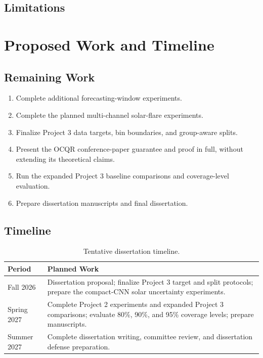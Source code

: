 \documentclass[12pt]{report}
\begin{document}
\section{Limitations}

\chapter{Proposed Work and Timeline}
\label{chap:timeline}

\section{Remaining Work}

\begin{enumerate}
    \item Complete additional forecasting-window experiments.
    \item Complete the planned multi-channel solar-flare experiments.
    \item Finalize Project 3 data targets, bin boundaries, and group-aware splits.
    \item Present the OCQR conference-paper guarantee and proof in full, without extending its theoretical claims.
    \item Run the expanded Project 3 baseline comparisons and coverage-level evaluation.
    \item Prepare dissertation manuscripts and final dissertation.
\end{enumerate}

\section{Timeline}

\begin{table}[ht]
    \centering
    \caption{Tentative dissertation timeline.}
    \label{tab:timeline}
    \begin{tabular}{p{}p{}}
        \toprule
        Period & Planned Work \\
        \midrule
        Fall 2026 &
        Dissertation proposal; finalize Project 3 target and split protocols;
        prepare the compact-CNN solar uncertainty experiments. \\

        Spring 2027 &
        Complete Project 2 experiments and expanded Project 3 comparisons;
        evaluate 80\%, 90\%, and 95\% coverage levels; prepare manuscripts. \\

        Summer 2027 &
        Complete dissertation writing, committee review, and dissertation
        defense preparation. \\
        \bottomrule
    \end{tabular}
\end{table}
\end{document}
